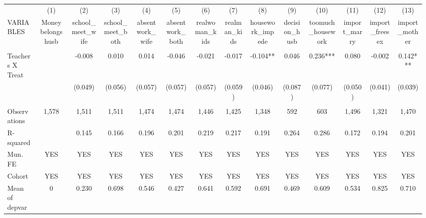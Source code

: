 \begin{tabular}{lccccccccccccc} \hline
 & (1) & (2) & (3) & (4) & (5) & (6) & (7) & (8) & (9) & (10) & (11) & (12) & (13) \\
VARIABLES & Money belongs husb & school\_meet\_wife & school\_meet\_both & absentwork\_wife & absentwork\_both & realwoman\_kids & realman\_kids & housework\_impede & decision\_husb & toomuch\_housework & import\_marry & import\_freesex & import\_mother \\ \hline
 &  &  &  &  &  &  &  &  &  &  &  &  &  \\
Teachers X Treat &  & -0.008 & 0.010 & 0.014 & -0.046 & -0.021 & -0.017 & -0.104** & 0.046 & 0.236*** & 0.080 & -0.002 & 0.142*** \\
 &  & (0.049) & (0.056) & (0.057) & (0.057) & (0.057) & (0.059) & (0.046) & (0.087) & (0.077) & (0.050) & (0.041) & (0.039) \\
 &  &  &  &  &  &  &  &  &  &  &  &  &  \\
Observations & 1,578 & 1,511 & 1,511 & 1,474 & 1,474 & 1,446 & 1,425 & 1,348 & 592 & 603 & 1,496 & 1,321 & 1,470 \\
R-squared &  & 0.145 & 0.166 & 0.196 & 0.201 & 0.219 & 0.217 & 0.191 & 0.264 & 0.286 & 0.172 & 0.194 & 0.201 \\
Mun. FE & YES & YES & YES & YES & YES & YES & YES & YES & YES & YES & YES & YES & YES \\
Cohort & YES & YES & YES & YES & YES & YES & YES & YES & YES & YES & YES & YES & YES \\
 Mean of depvar & 0 & 0.230 & 0.698 & 0.546 & 0.427 & 0.641 & 0.592 & 0.691 & 0.469 & 0.609 & 0.534 & 0.825 & 0.710 \\ \hline
\end{tabular}
